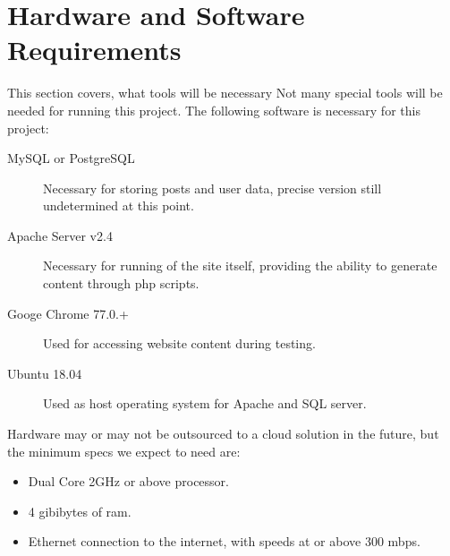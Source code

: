 \section{Hardware and Software Requirements}

This section covers, what tools will be necessary
Not many special tools will be needed for running this project.
The following software is necessary for this project:
\begin{description}
\item [MySQL or PostgreSQL] Necessary for storing posts and user data,
precise version still undetermined at this point.
\item [Apache Server v2.4] Necessary for running of the site itself,
providing the ability to generate content through php scripts.
\item [Googe Chrome 77.0.+] Used for accessing website content during testing.
\item [Ubuntu 18.04] Used as host operating system for Apache and SQL server.
\end{description}

Hardware may or may not be outsourced to a cloud solution in the future,
but the minimum specs we expect to need are:

\begin{itemize}
\item Dual Core 2GHz or above processor.
\item 4 gibibytes of ram.
\item Ethernet connection to the internet, with speeds at or above 300 mbps.
\end{itemize}